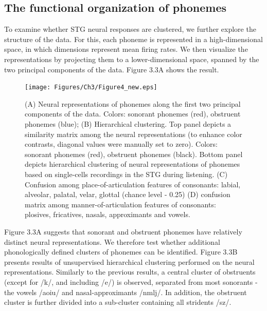 \subsection{The functional organization of phonemes}
To examine whether STG neural responses are clustered, we further explore the structure of the data. For this, each phoneme is represented in a high-dimensional space, in which dimensions represent mean firing rates. We then visualize the representations by projecting them to a lower-dimensional space, spanned by the two principal components of the data. Figure 3.3A shows the result.

\begin{figure}[H]
\vspace{.3in}
\texttt{[image: Figures/Ch3/Figure4\_new.eps]}
\caption{(A) Neural representations of phonemes along the first two principal components of the data. Colors: sonorant phonemes (red), obstruent phonemes (blue); (B) Hierarchical clustering. Top panel depicts a similarity matrix among the neural representations (to enhance color contrasts, diagonal values were manually set to zero). Colors: sonorant phonemes (red), obstruent phonemes (black). Bottom panel depicts hierarchical clustering of neural representations of phonemes based on single-cells recordings in the STG during listening. (C) Confusion among place-of-articulation features of consonants: labial, alveolar, palatal, velar, glottal (chance level - 0.25) (D) confusion matrix among manner-of-articulation features of consonants: plosives, fricatives, nasals, approximants and vowels.}
\end{figure}

Figure 3.3A suggests that sonorant and obstruent phonemes have relatively distinct neural representations. We therefore test whether additional phonologically defined clusters of phonemes can be identified. Figure 3.3B presents results of unsupervised hierarchical clustering performed on the neural representations. Similarly to the previous results, a central cluster of obstruents (except for /k/, and including /e/) is observed, separated from most sonorants - the vowels /aoiu/ and nasal-approximants /nmlj/. In addition, the obstruent cluster is further divided into a sub-cluster containing all stridents /sz/. 

